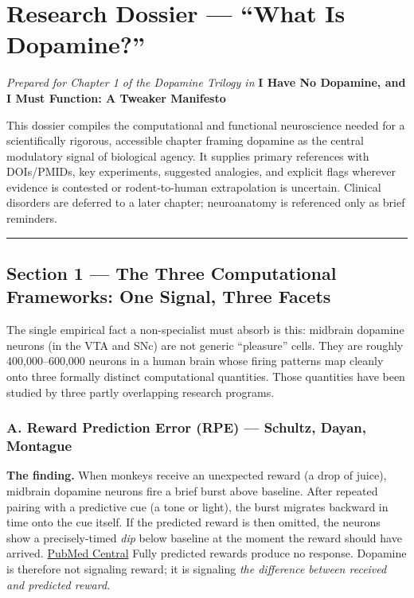 ﻿\section{Research Dossier --- ``What Is Dopamine?''}\label{01_dopamine_substrate-research-dossier-what-is-dopamine}

\emph{Prepared for Chapter 1 of the Dopamine Trilogy in} \textbf{I Have No Dopamine, and I Must Function: A Tweaker Manifesto}

This dossier compiles the computational and functional neuroscience needed for a scientifically rigorous, accessible chapter framing dopamine as the central modulatory signal of biological agency. It supplies primary references with DOIs/PMIDs, key experiments, suggested analogies, and explicit flags wherever evidence is contested or rodent-to-human extrapolation is uncertain. Clinical disorders are deferred to a later chapter; neuroanatomy is referenced only as brief reminders.

\begin{center}\rule{0.5\linewidth}{0.5pt}\end{center}

\subsection{Section 1 --- The Three Computational Frameworks: One Signal, Three Facets}\label{01_dopamine_substrate-section-1-the-three-computational-frameworks-one-signal-three-facets}

The single empirical fact a non-specialist must absorb is this: midbrain dopamine neurons (in the VTA and SNc) are not generic ``pleasure'' cells. They are roughly 400,000--600,000 neurons in a human brain whose firing patterns map cleanly onto three formally distinct computational quantities. Those quantities have been studied by three partly overlapping research programs.

\subsubsection{A. Reward Prediction Error (RPE) --- Schultz, Dayan, Montague}\label{01_dopamine_substrate-a.-reward-prediction-error-rpe-schultz-dayan-montague}

\textbf{The finding.} When monkeys receive an unexpected reward (a drop of juice), midbrain dopamine neurons fire a brief burst above baseline. After repeated pairing with a predictive cue (a tone or light), the burst migrates backward in time onto the cue itself. If the predicted reward is then omitted, the neurons show a precisely-timed \emph{dip} below baseline at the moment the reward should have arrived. \href{https://pmc.ncbi.nlm.nih.gov/articles/PMC6672808/}{PubMed Central} Fully predicted rewards produce no response. Dopamine is therefore not signaling reward; it is signaling \emph{the difference between received and predicted reward}.

